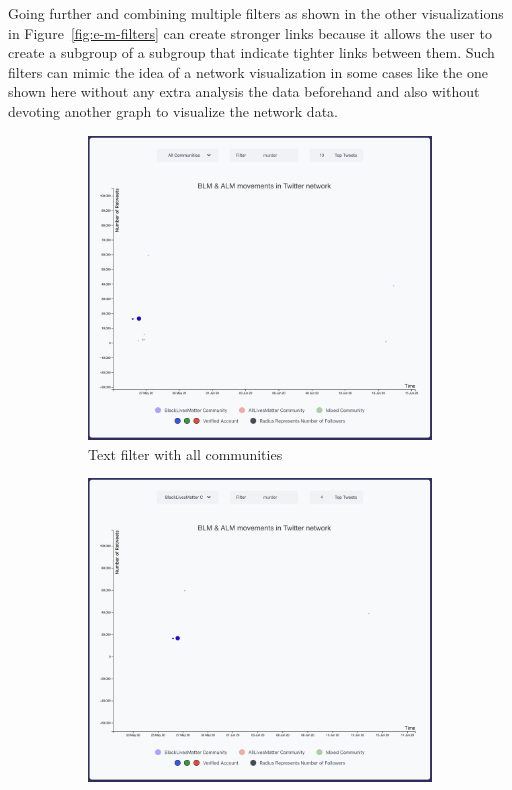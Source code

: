 Going further and combining multiple filters as shown in the other visualizations in Figure~\ref{fig:e-m-filters} can create stronger links because it allows the user to create a subgroup of a subgroup that indicate tighter links between them. Such filters can mimic the idea of a network visualization in some cases like the one shown here without any extra analysis the data beforehand and also without devoting another graph to visualize the network data.    



\begin{figure}[H]
\begin{subfigure}{.5\textwidth}
  \centering
  \captionsetup{justification=centering}
  \includegraphics[width=1\linewidth]{Report-latex/tex_files/pics/example/allF.png}  
  \caption{Text filter with all communities}
  \label{fig:sub-first}
\end{subfigure}
\begin{subfigure}{.5\textwidth}
  \centering
  \captionsetup{justification=centering}
  \includegraphics[width=1\linewidth]{Report-latex/tex_files/pics/example/blmF.png}  

\end{subfigure}
\end{figure}
